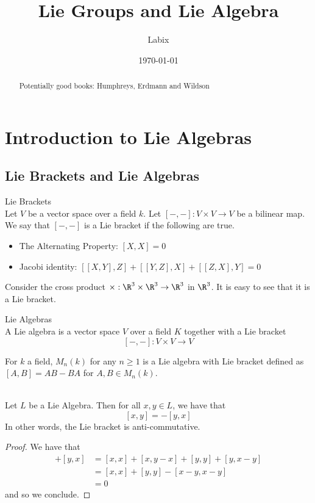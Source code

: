 \documentclass[a4paper]{article}
\title{Lie Groups and Lie Algebra}
\author{Labix}
\date{\today}
\begin{document}
\maketitle
\begin{abstract}
Potentially good books: Humphreys, Erdmann and Wildson
\end{abstract}
\pagebreak
\tableofcontents
\pagebreak

\section{Introduction to Lie Algebras}
\subsection{Lie Brackets and Lie Algebras}
\begin{defn}{Lie Brackets}{} \\Let $V$ be a vector space over a field $k$. Let $[-,-]:V\times V\to V$ be a bilinear map. We say that $[-,-]$ is a Lie bracket if the following are true. 
\begin{itemize}
\item The Alternating Property: $[X,X]=0$
\item Jacobi identity: $[[X,Y],Z]+[[Y,Z],X]+[[Z,X],Y]=0$
\end{itemize}
\end{defn}

Consider the cross product $\times:\R^3\times\R^3\to\R^3$ in $\R^3$. It is easy to see that it is a Lie bracket. 

\begin{defn}{Lie Algebras}{} \\A Lie algebra is a vector space $V$ over a field $K$ together with a Lie bracket $$[-,-]:V\times V\to V$$
\end{defn}

For $k$ a field, $M_n(k)$ for any $n\geq 1$ is a Lie algebra with Lie bracket defined as $[A,B]=AB-BA$ for $A,B\in M_n(k)$. 

\begin{lmm}{}{} \\Let $L$ be a Lie Algebra. Then for all $x,y\in L$, we have that $$[x,y]=-[y,x]$$ In other words, the Lie bracket is anti-commutative. 
\begin{proof}
We have that 
\begin{align*}
[x,y]+[y,x]&=[x,x]+[x,y-x]+[y,y]+[y,x-y]\tag{Bilinearity}\\
&=[x,x]+[y,y]-[x-y,x-y]\tag{Bilinearity}\\
&=0\tag{Alternating}
\end{align*}
and so we conclude. 
\end{proof}
\end{lmm}
\end{document}
